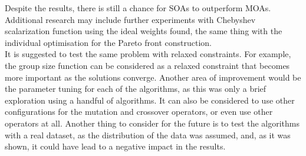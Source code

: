 Despite the results, there is still a chance for SOAs to outperform MOAs. Additional research may include further experiments with Chebyshev scalarization function using the ideal weights found, the same thing with the individual optimisation for the Pareto front construction.\\

It is suggested to test the same problem with relaxed constraints. For example, the group size function can be considered as a relaxed constraint that becomes more important as the solutions converge. Another area of improvement would be the parameter tuning for each of the algorithms, as this was only a brief exploration using a handful of algorithms. It can also be considered to use other configurations for the mutation and crossover operators, or even use other operators at all. Another thing to consider for the future is to test the algorithms with a real dataset, as the distribution of the data was assumed, and, as it was shown, it could have lead to a negative impact in the results. \\